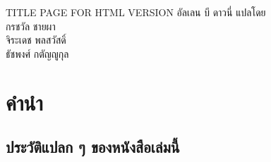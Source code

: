 \begin{htmlonly}
TITLE PAGE FOR HTML VERSION
{\Large \thetitle}
{\large อัลเลน บี ดาวนี่}
แปลโดย
\\
กรชวัล ชายผา
\\
จิระเดช พลสวัสดิ์
\\
ธัชพงศ์ กตัญญูกุล


\thedate

\setcounter{chapter}{-1}

\end{htmlonly}

\fi


\chapter{คำนำ}

\section*{ประวัติแปลก ๆ ของหนังสือเล่มนี้}

%
%


